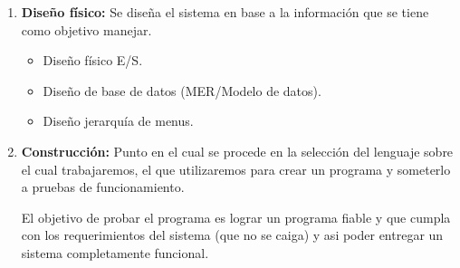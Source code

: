 \documentclass{templateNote}
\begin{document}
\begin{enumerate}
        \item \textbf{Diseño físico:} Se diseña el sistema en base a la información que se tiene como objetivo manejar.
        \begin{itemize}
            \item Diseño físico E/S.
            \item Diseño de base de datos (MER/Modelo de datos).
            \item Diseño jerarquía de menus.
        \end{itemize}
    \item \label{item:ConsCas} \textbf{Construcción:} Punto en el cual se procede en la selección del lenguaje sobre el cual trabajaremos, el que utilizaremos para crear un programa y someterlo a pruebas de funcionamiento.
    
    El objetivo de probar el programa es lograr un programa fiable y que cumpla con los requerimientos del sistema (que no se caiga) y asi poder entregar un sistema completamente funcional.
    

\end{enumerate}
\end{document}
